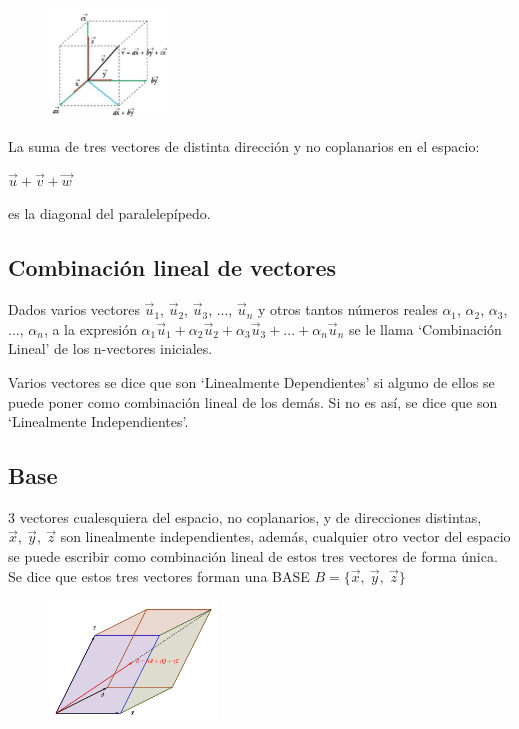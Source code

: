 \begin{multicols}{2}
	\begin{figure}[H]
	\centering
	\includegraphics[width=0.30\textwidth]{imagenes/imagenescv/T10IM04.png}
	\end{figure}
	
	La suma de tres vectores de distinta dirección y no coplanarios en el espacio: 
	
	\centerline{$\vec u+\vec v+\vec w$} 
	
	es la diagonal del paralelepípedo.
\end{multicols}

\subsection{Combinación lineal de vectores}

	Dados varios vectores $\vec u_1$, $\vec u_2$, $\vec u_3$, ..., $\vec u_n$ y otros tantos números reales $\alpha_1$, $\alpha_2$, $\alpha_3$, ..., $\alpha_n$, a la expresión $\alpha_1 \vec u_1+\alpha_2 \vec u_2+\alpha_3 \vec u_3+...+\alpha_n \vec u_n$ se le llama `Combinación Lineal' de los n-vectores iniciales.
		
		
	Varios vectores se dice que son `Linealmente Dependientes'  si alguno de ellos se puede poner como combinación lineal de los demás. Si no es así, se dice que son `Linealmente Independientes'.
	

\subsection{Base}

\begin{multicols}{2}
	3 vectores cualesquiera del espacio, no coplanarios, y de direcciones distintas, $\vec x,\ \vec y, \ \vec z$ son linealmente independientes, además, cualquier otro vector del espacio se puede escribir como combinación lineal de estos tres vectores de forma única. Se dice que estos tres vectores forman una BASE $B=\{\vec x,\ \vec y, \ \vec z\}$
	\begin{figure}[H]
	\centering
	\includegraphics[width=0.40\textwidth]{imagenes/imagenescv/T10IM06.png}
	\end{figure}
\end{multicols}

